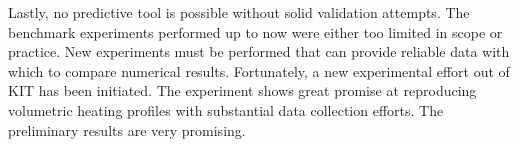 Lastly, no predictive tool is possible without solid validation attempts. The benchmark experiments performed up to now were either too limited in scope or practice. New experiments must be performed that can provide reliable data with which to compare numerical results. Fortunately, a new experimental effort out of KIT has been initiated.\cite{Hernandez2014} The experiment shows great promise at reproducing volumetric heating profiles with substantial data collection efforts. The preliminary results are very promising.